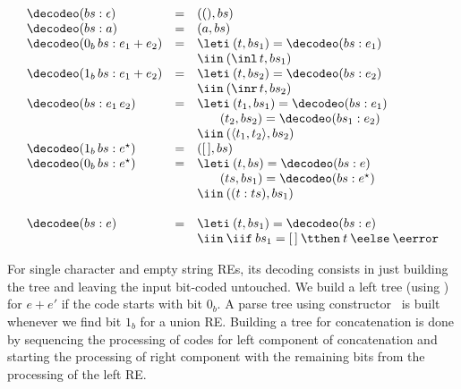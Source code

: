 \[
\begin{array}{lcl}
  \decodeo (bs : \epsilon) & = & ((), bs) \\
  \decodeo (bs : a)        & = & (a , bs) \\
  \decodeo (0_b\,bs : e_1 + e_2) & = & \leti\:(t,bs_1) = \decodeo (bs : e_1)\\
                                 &   & \iin\:(\inl\,t,bs_1)\\ 
  \decodeo (1_b\,bs : e_1 + e_2) & = & \leti\:(t,bs_2) = \decodeo (bs : e_2)\\
                                 &   & \iin\:(\inr\,t,bs_2)\\ 
  \decodeo (bs : e_1\,e_2) & = & \leti\:(t_1,bs_1) = \decodeo(bs : e_1) \\
                           &   & \,\,\,\,\,\,\,\,\,\,\,(t_2,bs_2) = \decodeo(bs_1 : e_2)\\
                           &   & \iin\:(\langle t_1,t_2\rangle, bs_2)\\
  \decodeo (1_b\,bs : e^\star) & = & ([\,],bs)\\
  \decodeo (0_b\,bs : e^\star) & = & \leti\:(t,bs) = \decodeo (bs : e)\\
                               &   & \,\,\,\,\,\,\,\,\,\,\,(ts,bs_1) = \decodeo(bs : e ^\star) \\ 
                               &   & \iin\: ((t : ts), bs_1)\\
  \\
  \decodee (bs : e) & = & \leti\:(t,bs_1) = \decodeo(bs : e)\\
                    &   & \iin\:\iif\:bs_1 = [\,]\:\tthen\:t\:\eelse\:\eerror \\
\end{array}
\]



For single character and empty string REs, its decoding consists in just building
the tree and leaving the input bit-coded untouched. We build a left tree (using \inl)
for $e + e'$ if the code starts with bit $0_b$. A parse tree using constructor \inr$\,$ is built
whenever we find bit $1_b$ for a union RE. Building a tree for concatenation is done by
sequencing the processing of codes for left component of concatenation and starting the
processing of right component with the remaining bits from the processing of the left RE.

